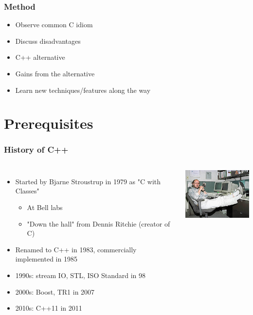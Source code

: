 \documentclass[table]{beamer}
\newcommand{\declarelesson}{\textbf{\color{themegreen}{Lesson:}} }
\begin{document}


\begin{frame}
    \frametitle{Method}
    \begin{itemize}
        \item<1->Observe common C idiom
        \item<1->Discuss disadvantages
        \item<1->C++ alternative
        \item<1->Gains from the alternative
        \item<2->Learn new techniques/features along the way
    \end{itemize}
\end{frame}


\section{Prerequisites}
\frame{\sectionpage}

\begin{frame}
    \frametitle{\declarelesson History of C++}
    \begin{columns}[t]
        \column{7cm}
        \begin{itemize}
            \item<1->Started by Bjarne Stroustrup in 1979 as "C with Classes"
                \begin{itemize}
                    \item At Bell labs
                    \item "Down the hall" from Dennis Ritchie (creator of C)
                \end{itemize}
            \item<1->Renamed to C++ in 1983, commercially implemented in 1985
            \item<2->1990s: stream IO, STL, ISO Standard in 98
            \item<3->2000s: Boost, TR1 in 2007
            \item<4->2010s: C++11 in 2011
        \end{itemize}
        \column[T]{4cm}
        \includegraphics[width=4cm]{220px-BjarneStroustrup.jpg}
    \end{columns}
\end{frame}
\end{document}

